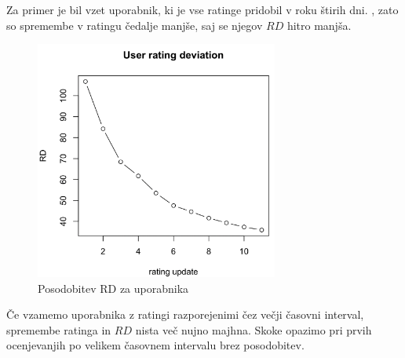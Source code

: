 \documentclass{IEEEtran}
\begin{document}
Za primer je bil vzet uporabnik, ki je vse ratinge pridobil v roku štirih dni. , zato so spremembe v ratingu čedalje manjše, saj se njegov $RD$ hitro manjša.
\begin{figure}[h!]
    \includegraphics[width=8cm]{RDUserExample}
    \caption{Posodobitev RD za uporabnika}%
    \label{fig:example}%
\end{figure}
\newpage
Če vzamemo uporabnika z ratingi razporejenimi čez večji časovni interval, spremembe ratinga in $RD$ nista več nujno majhna. Skoke opazimo pri prvih ocenjevanjih po velikem časovnem intervalu brez posodobitev.
\end{document}
